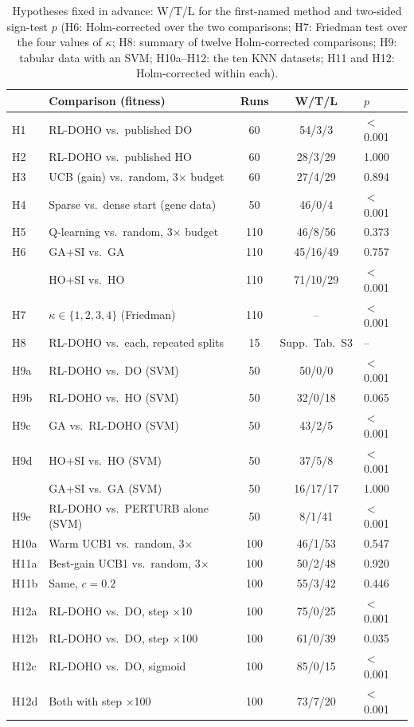 \documentclass[pdflatex,sn-basic]{sn-jnl}
\begin{document}
\begin{table}[t]
\centering
\caption{Hypotheses fixed in advance: W/T/L for the first-named method and two-sided sign-test $p$ (H6: Holm-corrected over the two comparisons; H7: Friedman test over the four values of $\kappa$; H8: summary of twelve Holm-corrected comparisons; H9: tabular data with an SVM; H10a--H12: the ten KNN datasets; H11 and H12: Holm-corrected within each).}
\label{tab:hyp}
\footnotesize
\setlength{\tabcolsep}{1.7pt}
\begin{tabular}{@{}llccl@{}}
\toprule
& Comparison (fitness) & Runs & W/T/L & $p$ \\
\midrule
H1 & RL-DOHO vs.\ published DO & 60 & 54/3/3 & $<$0.001 \\
H2 & RL-DOHO vs.\ published HO & 60 & 28/3/29 & 1.000 \\
H3 & UCB (gain) vs.\ random, 3$\times$ budget & 60 & 27/4/29 & 0.894 \\
H4 & Sparse vs.\ dense start (gene data) & 50 & 46/0/4 & $<$0.001 \\
\midrule
H5 & Q-learning vs.\ random, 3$\times$ budget & 110 & 46/8/56 & 0.373 \\
H6 & GA+SI vs.\ GA & 110 & 45/16/49 & 0.757 \\
   & HO+SI vs.\ HO & 110 & 71/10/29 & $<$0.001 \\
H7 & $\kappa\in\{1,2,3,4\}$ (Friedman) & 110 & -- & $<$0.001 \\
H8 & RL-DOHO vs.\ each, repeated splits & 15 & Supp.\ Tab.~S3 & -- \\
\midrule
H9a & RL-DOHO vs.\ DO (SVM) & 50 & 50/0/0 & $<$0.001 \\
H9b & RL-DOHO vs.\ HO (SVM) & 50 & 32/0/18 & 0.065 \\
H9c & GA vs.\ RL-DOHO (SVM) & 50 & 43/2/5 & $<$0.001 \\
H9d & HO+SI vs.\ HO (SVM) & 50 & 37/5/8 & $<$0.001 \\
 & GA+SI vs.\ GA (SVM) & 50 & 16/17/17 & 1.000 \\
H9e & RL-DOHO vs.\ PERTURB alone (SVM) & 50 & 8/1/41 & $<$0.001 \\
\midrule
H10a & Warm UCB1 vs.\ random, 3$\times$ & 100 & 46/1/53 & 0.547 \\
H11a & Best-gain UCB1 vs.\ random, 3$\times$ & 100 & 50/2/48 & 0.920 \\
H11b & Same, $c=0.2$ & 100 & 55/3/42 & 0.446 \\
\midrule
H12a & RL-DOHO vs.\ DO, step $\times$10 & 100 & 75/0/25 & $<$0.001 \\
H12b & RL-DOHO vs.\ DO, step $\times$100 & 100 & 61/0/39 & 0.035 \\
H12c & RL-DOHO vs.\ DO, sigmoid & 100 & 85/0/15 & $<$0.001 \\
H12d & Both with step $\times$100 & 100 & 73/7/20 & $<$0.001 \\
\bottomrule
\end{tabular}
\end{table}
\end{document}
